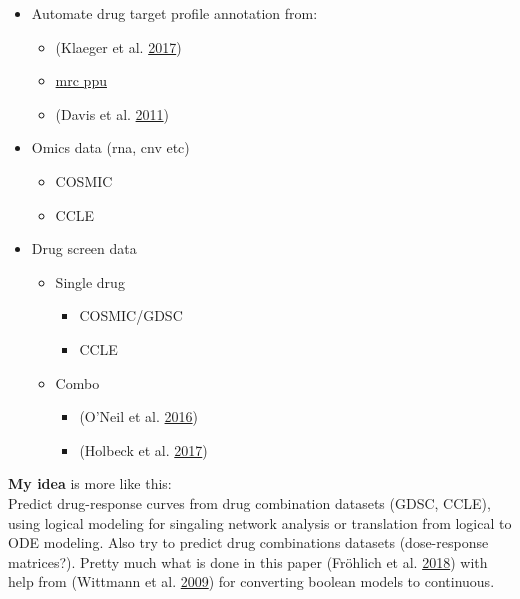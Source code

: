 \documentclass[12pt,]{book}
\providecommand{\tightlist}{%
  \setlength{\itemsep}{0pt}\setlength{\parskip}{0pt}}
\begin{document}
\begin{itemize}
\tightlist
\item
  Automate drug target profile annotation from:

  \begin{itemize}
  \tightlist
  \item
    (Klaeger et al. \protect\hyperlink{ref-Klaeger2017}{2017})
  \item
    \href{http://www.kinase-screen.mrc.ac.uk/}{mrc ppu}
  \item
    (Davis et al. \protect\hyperlink{ref-Davis2011}{2011})
  \end{itemize}
\item
  Omics data (rna, cnv etc)

  \begin{itemize}
  \tightlist
  \item
    COSMIC
  \item
    CCLE
  \end{itemize}
\item
  Drug screen data

  \begin{itemize}
  \tightlist
  \item
    Single drug

    \begin{itemize}
    \tightlist
    \item
      COSMIC/GDSC
    \item
      CCLE
    \end{itemize}
  \item
    Combo

    \begin{itemize}
    \tightlist
    \item
      (O'Neil et al. \protect\hyperlink{ref-ONeil2016}{2016})
    \item
      (Holbeck et al. \protect\hyperlink{ref-Holbeck2017}{2017})
    \end{itemize}
  \end{itemize}
\end{itemize}

\textbf{My idea} is more like this:\\
Predict drug-response curves from drug combination datasets (GDSC, CCLE),
using logical modeling for singaling network analysis or translation from
logical to ODE modeling. Also try to predict drug combinations datasets
(dose-response matrices?). Pretty much what is done in this paper (Fröhlich et al. \protect\hyperlink{ref-Frohlich2018}{2018})
with help from (Wittmann et al. \protect\hyperlink{ref-Wittmann2009}{2009}) for converting boolean models to continuous.
\end{document}
